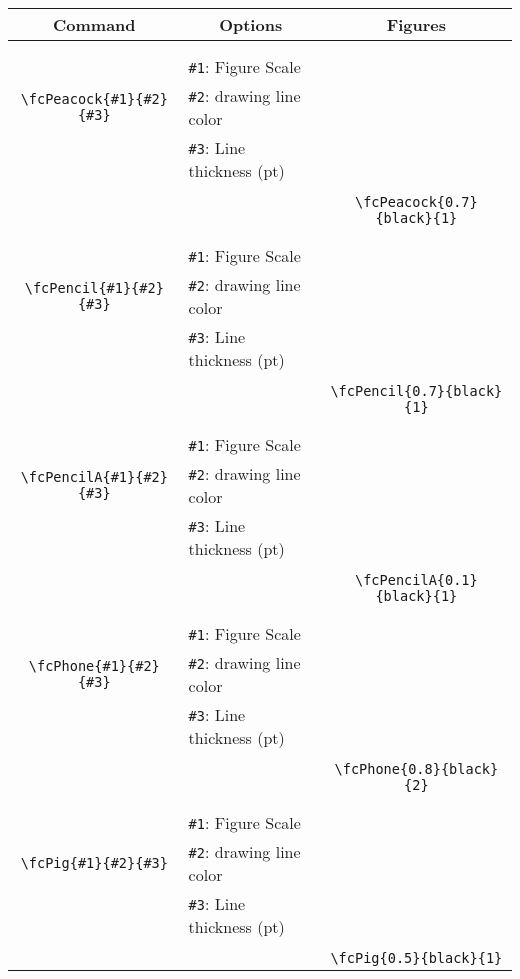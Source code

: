 \documentclass[x11names]{article}
\begin{document}
\begin{table}[H]\centering\begin{tabular}{|c|l|c|}\hline {\bf Command}& \multicolumn{1}{c|}{{\bf Options}} & {\bf Figures}\\  \hline	&&\multirow{5}{*}{\fcPeacock{0.7}{black}{1}}\\	&&\\	&\verb|#1|: Figure Scale &\\	\verb|\fcPeacock{#1}{#2}{#3}|&	\verb|#2|: drawing line color &\\	&\verb|#3|: Line thickness (pt) &\\ &&\\&&	\verb|\fcPeacock{0.7}{black}{1}|\\\hline 	
	&&\multirow{5}{*}{\fcPencil{0.7}{black}{1}}\\	&&\\	&\verb|#1|: Figure Scale &\\	\verb|\fcPencil{#1}{#2}{#3}|&	\verb|#2|: drawing line color &\\	&\verb|#3|: Line thickness (pt) &\\ &&\\&&	\verb|\fcPencil{0.7}{black}{1}|\\\hline 	
	&&\multirow{5}{*}{\fcPencilA{0.1}{black}{1}}\\	&&\\	&\verb|#1|: Figure Scale &\\	\verb|\fcPencilA{#1}{#2}{#3}|&	\verb|#2|: drawing line color &\\	&\verb|#3|: Line thickness (pt) &\\ &&\\&&	\verb|\fcPencilA{0.1}{black}{1}|\\\hline 	
	&&\multirow{5}{*}{\fcPhone{0.8}{black}{2}}\\	&&\\	&\verb|#1|: Figure Scale &\\	\verb|\fcPhone{#1}{#2}{#3}|&	\verb|#2|: drawing line color &\\	&\verb|#3|: Line thickness (pt) &\\ &&\\&&	\verb|\fcPhone{0.8}{black}{2}|\\\hline 	
	&&\multirow{5}{*}{\fcPig{0.5}{black}{1}}\\	&&\\	&\verb|#1|: Figure Scale &\\	\verb|\fcPig{#1}{#2}{#3}|&	\verb|#2|: drawing line color &\\	&\verb|#3|: Line thickness (pt) &\\ &&\\&&	\verb|\fcPig{0.5}{black}{1}|\\\hline 	

\end{tabular}
\end{table}
\end{document}
